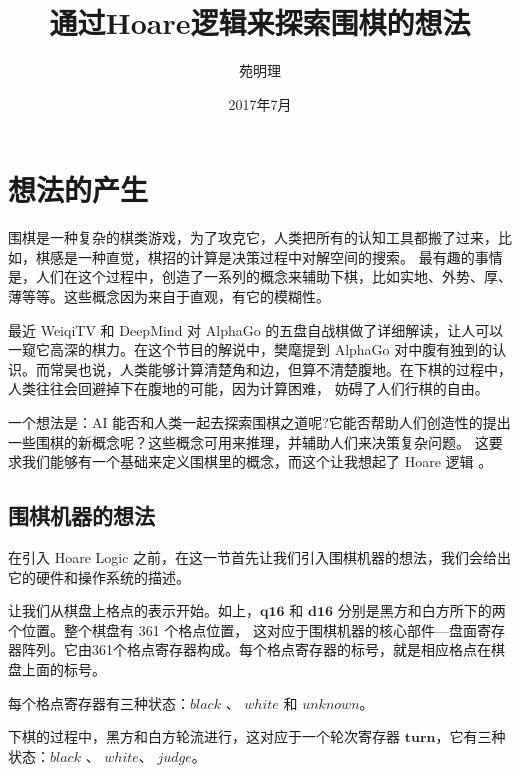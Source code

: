 \documentclass[a4paper,10.5pt]{article}
\title{通过Hoare逻辑来探索围棋的想法}
\author{苑明理}
\date{2017年7月}
\begin{document}
\maketitle{}
\renewcommand\contentsname{目录}
\setcounter{tocdepth}{2}
\tableofcontents

\newpage

\section{想法的产生}

围棋是一种复杂的棋类游戏，为了攻克它，人类把所有的认知工具都搬了过来，比如，棋感是一种直觉，棋招的计算是决策过程中对解空间的搜索。
最有趣的事情是，人们在这个过程中，创造了一系列的概念来辅助下棋，比如实地、外势、厚、薄等等。这些概念因为来自于直观，有它的模糊性。

最近 WeiqiTV 和 DeepMind 对 AlphaGo 的五盘自战棋做了详细解读，让人可以一窥它高深的棋力。在这个节目的解说中，樊麾提到 AlphaGo
对中腹有独到的认识。而常昊也说，人类能够计算清楚角和边，但算不清楚腹地。在下棋的过程中，人类往往会回避掉下在腹地的可能，因为计算困难，
妨碍了人们行棋的自由。

一个想法是：AI 能否和人类一起去探索围棋之道呢?它能否帮助人们创造性的提出一些围棋的新概念呢？这些概念可用来推理，并辅助人们来决策复杂问题。
这要求我们能够有一个基础来定义围棋里的概念，而这个让我想起了 Hoare 逻辑 。

\subsection{围棋机器的想法}

在引入 Hoare Logic 之前，在这一节首先让我们引入围棋机器的想法，我们会给出它的硬件和操作系统的描述。

\setcounter{gomove}{-1}
\begin{center}
\begin{psgoboard}
\end{psgoboard}
\end{center}

让我们从棋盘上格点的表示开始。如上，$\mathbf{q16}$ 和 $\mathbf{d16}$ 分别是黑方和白方所下的两个位置。整个棋盘有 361 个格点位置，
这对应于围棋机器的核心部件—盘面寄存器阵列。它由361个格点寄存器构成。每个格点寄存器的标号，就是相应格点在棋盘上面的标号。

每个格点寄存器有三种状态：$\mathit{black}$ 、 $\mathit{white}$ 和 $\mathit{unknown}$。

下棋的过程中，黑方和白方轮流进行，这对应于一个轮次寄存器 $\mathbf{turn}$，它有三种状态：$\mathit{black}$ 、 $\mathit{white}$、 $\mathit{judge}$。
\end{document}
